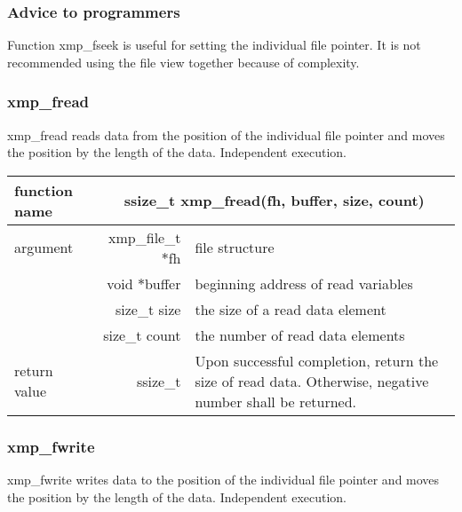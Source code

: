    \subsubsection*{Advice to programmers}

   Function xmp\_fseek is useful for setting the individual file pointer.
   It is not recommended using the file view together because of complexity.

   \subsubsection{xmp\_fread}
   xmp\_fread reads data from the position of the individual file
   pointer and moves the position by the length of the data.
   Independent execution.

   \begin{table}[h]
    \begin{center}
     \begin{tabular}{|l|r|p{80mm}|}
      \hline
      {\bf function name}  & \multicolumn{2}{c|}{\bf ssize\_t
      xmp\_fread(fh, buffer, size, count)} \\ \hline \hline
      argument & xmp\_file\_t $*$fh & file structure \\ \cline{2-3}
      & void $*$buffer & beginning address of read variables \\ \cline{2-3}
      & size\_t size & the size of a read data element \\ \cline{2-3}
      & size\_t count & the number of read data elements \\ \hline
      return value & ssize\_t & Upon successful completion, return the size
	      of read data. Otherwise, negative number shall be
	      returned. \\ \hline
      \end{tabular}
     \end{center}
    \label{tb:aaa}
   \end{table}

   \subsubsection{xmp\_fwrite}
   xmp\_fwrite writes data to the position of the individual file
   pointer and moves the position by the length of the data.
   Independent execution.

